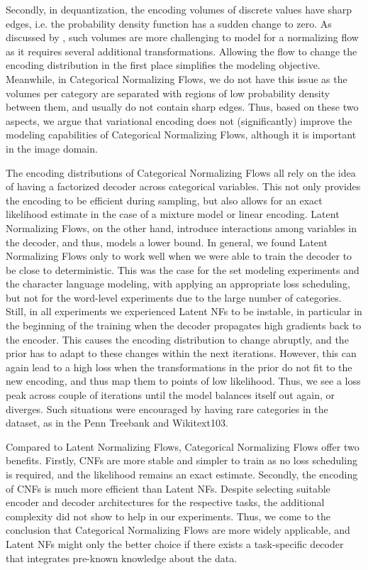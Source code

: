 Secondly, in dequantization, the encoding volumes of discrete values have sharp edges, i.e. the probability density function has a sudden change to zero.
As discussed by \citet{Flow++}, such volumes are more challenging to model for a normalizing flow as it requires several additional transformations.
Allowing the flow to change the encoding distribution in the first place simplifies the modeling objective.
Meanwhile, in Categorical Normalizing Flows, we do not have this issue as the volumes per category are separated with regions of low probability density between them, and usually do not contain sharp edges.
Thus, based on these two aspects, we argue that variational encoding does not (significantly) improve the modeling capabilities of Categorical Normalizing Flows, although it is important in the image domain.

The encoding distributions of Categorical Normalizing Flows all rely on the idea of having a factorized decoder across categorical variables.
This not only provides the encoding to be efficient during sampling, but also allows for an exact likelihood estimate in the case of a mixture model or linear encoding.
Latent Normalizing Flows, on the other hand, introduce interactions among variables in the decoder, and thus, models a lower bound. 
In general, we found Latent Normalizing Flows only to work well when we were able to train the decoder to be close to deterministic.
This was the case for the set modeling experiments and the character language modeling, with applying an appropriate loss scheduling, but not for the word-level experiments due to the large number of categories.
Still, in all experiments we experienced Latent NFs to be instable, in particular in the beginning of the training when the decoder propagates high gradients back to the encoder. 
This causes the encoding distribution to change abruptly, and the prior has to adapt to these changes within the next iterations. 
However, this can again lead to a high loss when the transformations in the prior do not fit to the new encoding, and thus map them to points of low likelihood.
Thus, we see a loss peak across couple of iterations until the model balances itself out again, or diverges.
Such situations were encouraged by having rare categories in the dataset, as in the Penn Treebank and Wikitext103.  

Compared to Latent Normalizing Flows, Categorical Normalizing Flows offer two benefits.
Firstly, CNFs are more stable and simpler to train as no loss scheduling is required, and the likelihood remains an exact estimate.
Secondly, the encoding of CNFs is much more efficient than Latent NFs. 
Despite selecting suitable encoder and decoder architectures for the respective tasks, the additional complexity did not show to help in our experiments. 
Thus, we come to the conclusion that Categorical Normalizing Flows are more widely applicable, and Latent NFs might only the better choice if there exists a task-specific decoder that integrates pre-known knowledge about the data.

